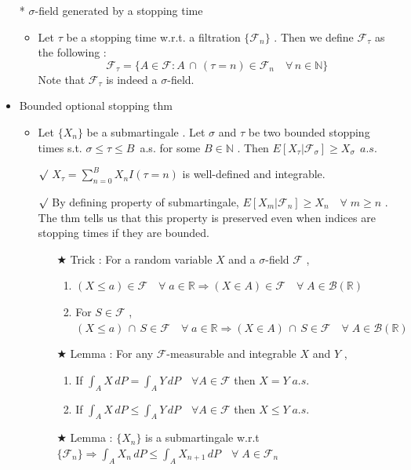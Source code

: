 \documentclass[12pt, A4]{article}
\newcommand{\rmk}{$\surd$}
\newcommand{\trick}{$\bigstar$}
\newcommand{\N}{\mathbb{N}}
\newcommand{\R}{\mathbb{R}}
\newcommand{\B}{\mathcal{B}}
\newcommand{\F}{\mathcal{F}}
\newcommand{\intersect}{\,\cap\,}
\newcommand{\foranyn}{\quad \forall \, n\in \N}
\begin{document}
\begin{itemize}
\begin{itemize}
\begin{itemize}
		\end{itemize} 
	\end{itemize}
	\item[*] $\sigma$-field generated by a stopping time
	\begin{itemize}
		\item Let $\tau$ be a stopping time w.r.t. a filtration $\{\F_n\}$ . Then we define $\F_\tau$ as the following : 
		$$
			\F_\tau = \{A\in \F : A\intersect (\tau=n)\in \F_n \foranyn\}
		$$
		Note that $\F_\tau$ is indeed a $\sigma$-field. 
	\end{itemize}
	\item Bounded optional stopping thm
	\begin{itemize}
		\item Let $\{X_n\}$ be a submartingale . Let $\sigma$ and $\tau$ be two bounded stopping times s.t. $\sigma\leq \tau\leq B$\;\, a.s. for some $B\in \N$ . Then $E[X_\tau |\F_\sigma] \geq X_\sigma\;\, a.s.$
		\item[\rmk] $X_\tau = \sum_{n=0}^B X_nI(\tau=n)$ is well-defined and integrable. 
		\item[\rmk] By defining property of submartingale, $E[X_m|\F_n]\geq X_n \quad \forall \;m\geq n$ . The thm tells us that this property is preserved even when indices are stopping times if they are bounded.
		\begin{itemize}
			\item[\trick] Trick : For a random variable $X$ and a $\sigma$-field $\F$ ,
			\begin{enumerate}
				\item $(X\leq a)\in \F \quad \forall \; a\in \R\Rightarrow (X\in A)\in \F \quad \forall \; A\in \B(\R)$
				\item For $S\in \F$ , $(X\leq a)\intersect S\in \F \quad \forall \; a\in \R\Rightarrow (X\in A)\intersect S \in \F \quad \forall \; A\in \B(\R)$
			\end{enumerate}
			\item[\trick] Lemma : For any $\F$-measurable and integrable $X$ and $Y$ ,
			\begin{enumerate}
				\item If $\int_A X\, dP=\int_A Y \, dP\quad \forall A\in \F$ then $X=Y\; a.s.$ 
				\item If $\int_A X\, dP \leq \int_A Y \, dP\quad \forall A\in \F$ then $X\leq Y\; a.s.$ 
			\end{enumerate}
			\item[\trick] Lemma : $\{X_n\}$ is a submartingale w.r.t $\{\F_n\} \Rightarrow \int_A X_n\, dP \leq \int_A X_{n+1}\, dP\quad \forall\; A\in \F_n$

\end{itemize}
\end{itemize}
\end{itemize}
\end{document}
